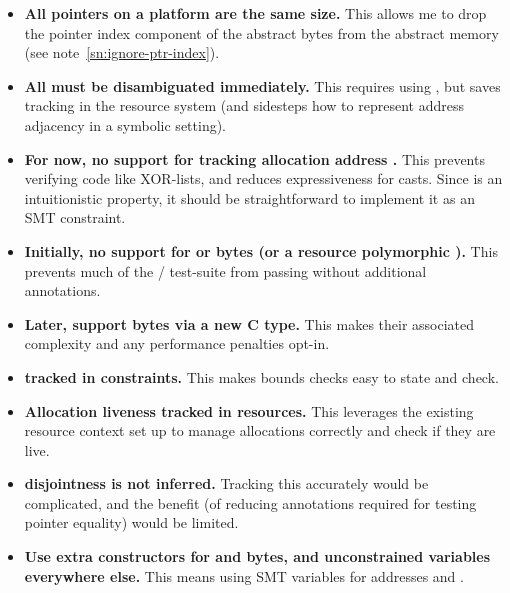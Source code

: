 \begin{itemize}
    \item \textbf{All pointers on a platform are the same size.} This
        allows me to drop the pointer index component of the abstract bytes
        from the abstract memory (see note~\ref{sn:ignore-ptr-index}).
    \item \textbf{All  must be disambiguated immediately.} This
        requires using , but saves tracking
         in the resource system (and sidesteps how
        to represent address adjacency in a symbolic setting).
    \item \textbf{For now, no support for tracking allocation address
        .} This prevents verifying code like XOR-lists, and
        reduces expressiveness for  casts. Since 
        is an intuitionistic property, it should be straightforward to
        implement it as an SMT constraint.
    \item \textbf{Initially, no support for  or bytes
        (or a resource polymorphic ).}
        This prevents much of the /
        test-suite from passing without additional annotations.
    \item \textbf{Later, support  bytes via a new C type.} This makes
        their associated complexity and any performance penalties opt-in.
    \item \textbf{ tracked in constraints.} This makes
        bounds checks easy to state and check.
    \item \textbf{Allocation liveness tracked in resources.} This leverages the
        existing resource context set up to manage allocations correctly and
        check if they are live.
    \item \textbf{ disjointness is not inferred.} Tracking
        this accurately would be complicated, and the benefit (of reducing
        annotations required for testing pointer equality) would be limited.
    \item \textbf{Use extra constructors for  and
         bytes, and unconstrained variables everywhere
        else.} This means using SMT variables for addresses and .
\end{itemize}
